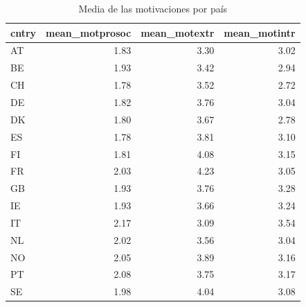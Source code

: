 \documentclass{article}
\begin{document}
\begin{table}

\caption{Media de las motivaciones por país}
\centering
\begin{tabular}[t]{lrrr}
\toprule
cntry & mean\_motprosoc & mean\_motextr & mean\_motintr\\
\midrule
AT & 1.83 & 3.30 & 3.02\\
BE & 1.93 & 3.42 & 2.94\\
CH & 1.78 & 3.52 & 2.72\\
DE & 1.82 & 3.76 & 3.04\\
DK & 1.80 & 3.67 & 2.78\\
\addlinespace
ES & 1.78 & 3.81 & 3.10\\
FI & 1.81 & 4.08 & 3.15\\
FR & 2.03 & 4.23 & 3.05\\
GB & 1.93 & 3.76 & 3.28\\
IE & 1.93 & 3.66 & 3.24\\
\addlinespace
IT & 2.17 & 3.09 & 3.54\\
NL & 2.02 & 3.56 & 3.04\\
NO & 2.05 & 3.89 & 3.16\\
PT & 2.08 & 3.75 & 3.17\\
SE & 1.98 & 4.04 & 3.08\\
\bottomrule
\end{tabular}
\end{table}
\end{document}
